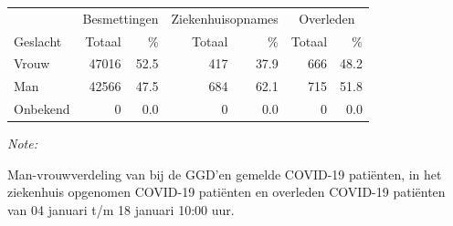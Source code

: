 \documentclass[
  english,
  man,floatsintext]{apa6}
\begin{document}
\begin{table}[H]
\centering\begingroup\fontsize{11}{13}\selectfont

\begin{threeparttable}
\begin{tabular}{lrrrrrr}
\toprule
\multicolumn{1}{c}{ } & \multicolumn{2}{c}{Besmettingen} & \multicolumn{2}{c}{Ziekenhuisopnames} & \multicolumn{2}{c}{Overleden} \\
\cmidrule(l{3pt}r{3pt}){2-3} \cmidrule(l{3pt}r{3pt}){4-5} \cmidrule(l{3pt}r{3pt}){6-7}
Geslacht & Totaal & \% & Totaal & \% & Totaal & \%\\
\midrule
Vrouw & 47016 & 52.5 & 417 & 37.9 & 666 & 48.2\\
Man & 42566 & 47.5 & 684 & 62.1 & 715 & 51.8\\
Onbekend & 0 & 0.0 & 0 & 0.0 & 0 & 0.0\\
\bottomrule
\end{tabular}
\begin{tablenotes}
\item \textit{Note: } 
\item Man-vrouwverdeling van bij de GGD’en gemelde COVID-19 patiënten, in het ziekenhuis opgenomen COVID-19 patiënten en overleden COVID-19 patiënten van 04 januari t/m 18 januari 10:00 uur.
\end{tablenotes}
\end{threeparttable}
\endgroup{}
\end{table}
\newpage
\end{document}
